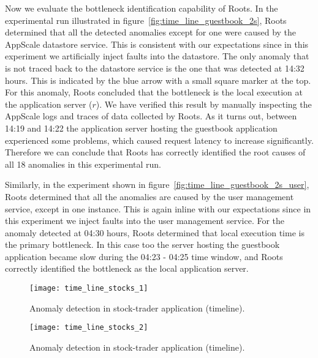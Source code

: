 Now we evaluate the bottleneck identification capability of Roots. In the experimental run illustrated in 
figure~\ref{fig:time_line_guestbook_2s}, Roots determined that all the detected anomalies except for one were 
caused by the AppScale datastore service. This is consistent with our expectations since in this experiment we 
artificially inject faults into the datastore.
The only anomaly that is not traced back to the datastore service is the one that was detected at 14:32 hours.
This is indicated by the blue arrow with a small square marker at the top. For this anomaly, Roots concluded that
the bottleneck is the local execution at the application server ($r$). We have verified
this result by manually inspecting the AppScale logs and traces of data collected by Roots. As it turns out,
between 14:19 and
14:22 the application server hosting the guestbook application experienced some problems, which caused
request latency to increase significantly. Therefore we can conclude that Roots has correctly identified 
the root causes of all 18 anomalies in this experimental run.

Similarly, in the experiment shown in figure~\ref{fig:time_line_guestbook_2s_user}, Roots determined
that all the anomalies are caused by the user management service, except in one instance. This is again
inline with our expectations since in this experiment we inject faults into the user management service. For the
anomaly detected at 04:30 hours, Roots determined that local execution time is the primary bottleneck.
In this case too the server hosting the guestbook application became slow
during the 04:23 - 04:25 time window, and Roots correctly identified the bottleneck as the local
application server.

\begin{figure}
\centering
\texttt{[image: time\_line\_stocks\_1]}
\caption{Anomaly detection in stock-trader application (timeline).}
\label{fig:time_line_stocks_1}
\end{figure}

\begin{figure}
\centering
\texttt{[image: time\_line\_stocks\_2]}
\caption{Anomaly detection in stock-trader application (timeline).}
\label{fig:time_line_stocks_2}
\end{figure}

